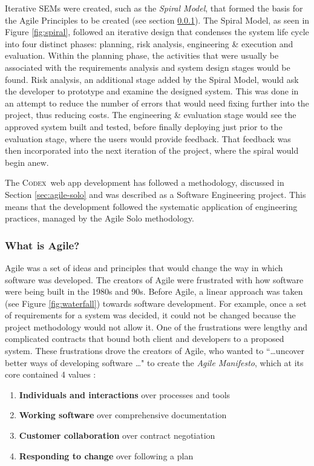 \documentclass[final]{cmpreport}
\newcommand{\Codex}{\textsc{Codex}}
\begin{document}
			Iterative SEMs were created, such as the \emph{Spiral Model}, that formed the basis for the Agile Principles to be created (see section \ref{sec:what-agile}). The Spiral Model, as seen in Figure \ref{fig:spiral}, followed an iterative design that condenses the system life cycle into four distinct phases: planning, risk analysis, engineering \& execution and evaluation. Within the planning phase, the activities that were usually be associated with the requirements analysis and system design stages would be found. Risk analysis, an additional stage added by the Spiral Model, would ask the developer to prototype and examine the designed system. This was done in an attempt to reduce the number of errors that would need fixing further into the project, thus reducing costs. The engineering \& evaluation stage would see the approved system built and tested, before finally deploying just prior to the evaluation stage, where the users would provide feedback. That feedback was then incorporated into the next iteration of the project, where the spiral would begin anew.
			
			The \Codex \ web app development has followed a methodology, discussed in Section \ref{sec:agile-solo} and was described as a Software Engineering project. This means that the development followed the systematic application of engineering practices, managed by the Agile Solo methodology.
				
			\subsubsection{What is Agile?} \label{sec:what-agile}
			Agile was a set of ideas and principles that would change the way in which software was developed. The creators of Agile were frustrated with how software were being built in the 1980s and 90s. Before Agile, a linear approach was taken (see Figure \ref{fig:waterfall}) towards software development. For example, once a set of requirements for a system was decided, it could not be changed because the project methodology would not allow it. One of the frustrations were lengthy and complicated contracts that bound both client and developers to a proposed system. These frustrations drove the creators of Agile, who wanted to ``\ldots uncover better ways of developing software \ldots" to create the \textit{Agile Manifesto}, which at its core contained 4 values \citep{AgileManifesto}:
			
			\begin{enumerate}
				\item \textbf{Individuals and interactions} over processes and tools
				\item \textbf{Working software} over comprehensive documentation
				\item \textbf{Customer collaboration} over contract negotiation
				\item \textbf{Responding to change} over following a plan 
			\end{enumerate}
		
\end{document}
